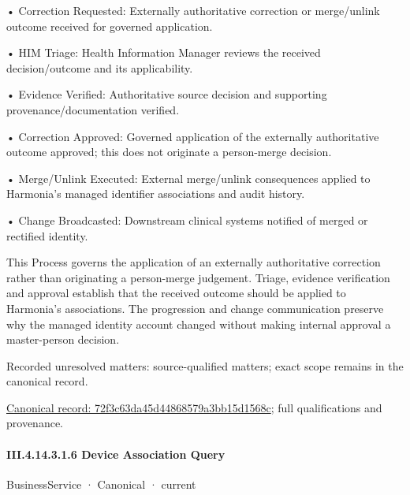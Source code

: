 •
Correction Requested: Externally authoritative correction or merge/unlink outcome received for governed application.



•
HIM Triage: Health Information Manager reviews the received decision/outcome and its applicability.



•
Evidence Verified: Authoritative source decision and supporting provenance/documentation verified.



•
Correction Approved: Governed application of the externally authoritative outcome approved; this does not originate a person-merge decision.



•
Merge/Unlink Executed: External merge/unlink consequences applied to Harmonia's managed identifier associations and audit history.



•
Change Broadcasted: Downstream clinical systems notified of merged or rectified identity.



This Process governs the application of an externally authoritative correction rather than originating a person-merge judgement. Triage, evidence verification and approval establish that the received outcome should be applied to Harmonia's associations. The progression and change communication preserve why the managed identity account changed without making internal approval a master-person decision.


{\small Recorded unresolved matters: source-qualified matters; exact scope remains in the canonical record.}\par
{\footnotesize \href{../../../../../../../../continuum/business/business-process/72f3c63da45d44868579a3bb15d1568c.md}{Canonical record: 72f3c63da45d44868579a3bb15d1568c}; full qualifications and provenance.}\par
\paragraph*{III.4.14.3.1.6 Device Association Query}
\label{navigation:III.4.14.3.1.6}

\label{element:01637c40914945d68d261c2094b86904}
{\small BusinessService · Canonical · current}\par

